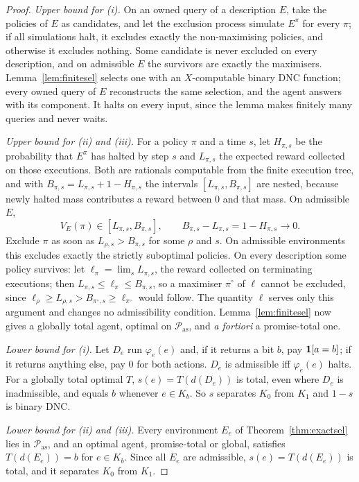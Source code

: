 \begin{proof}
\emph{Upper bound for (i).} On an owned query of a description $E$, take the policies of $E$ as
candidates, and let the exclusion process simulate $E^\pi$ for every $\pi$; if all simulations halt,
it excludes exactly the non-maximising policies, and otherwise it excludes nothing. Some candidate is
never excluded on every description, and on admissible $E$ the survivors are exactly the maximisers.
Lemma~\ref{lem:finitesel} selects one with an $X$-computable binary DNC function; every owned query of
$E$ reconstructs the same selection, and the agent answers with its component. It halts on every
input, since the lemma makes finitely many queries and never waits.

\emph{Upper bound for (ii) and (iii).} For a policy $\pi$ and a time $s$, let $H_{\pi,s}$ be the
probability that $E^\pi$ has halted by step $s$ and $L_{\pi,s}$ the expected reward collected on those
executions. Both are rationals computable from the finite execution tree, and with
$B_{\pi,s}=L_{\pi,s}+1-H_{\pi,s}$ the intervals $[L_{\pi,s},B_{\pi,s}]$ are nested, because newly
halted mass contributes a reward between $0$ and that mass. On admissible $E$,
\begin{equation}\label{eq:intervals}
  V_E(\pi)\in[L_{\pi,s},B_{\pi,s}],\qquad B_{\pi,s}-L_{\pi,s}=1-H_{\pi,s}\to0 .
\end{equation}
Exclude $\pi$ as soon as $L_{\rho,s}>B_{\pi,s}$ for some $\rho$ and $s$. On admissible environments
this excludes exactly the strictly suboptimal policies. On every description some policy survives:
let $\ell_\pi=\lim_sL_{\pi,s}$, the reward collected on terminating executions; then
$L_{\pi,s}\le\ell_\pi\le B_{\pi,s}$, so a maximiser $\pi^\circ$ of $\ell$ cannot be excluded, since
$\ell_\rho\ge L_{\rho,s}>B_{\pi^\circ,s}\ge\ell_{\pi^\circ}$ would follow. The quantity $\ell$ serves only
this argument and changes no admissibility condition. Lemma~\ref{lem:finitesel} now gives a globally
total agent, optimal on $\mathcal P_{\mathrm{as}}$, and \emph{a fortiori} a promise-total one.

\emph{Lower bound for (i).} Let $D_e$ run $\varphi_e(e)$ and, if it returns a bit $b$, pay
$\mathbf{1}[a=b]$; if it returns anything else, pay $0$ for both actions. $D_e$ is admissible iff
$\varphi_e(e)$ halts. For a globally total optimal $T$, $s(e)=T(d(D_e))$ is total, even where $D_e$ is
inadmissible, and equals $b$ whenever $e\in K_b$. So $s$ separates $K_0$ from $K_1$ and $1-s$ is binary
DNC.

\emph{Lower bound for (ii) and (iii).} Every environment $E_e$ of Theorem~\ref{thm:exactsel} lies in
$\mathcal P_{\mathrm{as}}$, and an optimal agent, promise-total or global, satisfies $T(d(E_e))=b$ for
$e\in K_b$. Since all $E_e$ are admissible, $s(e)=T(d(E_e))$ is total, and it separates $K_0$ from
$K_1$.
\end{proof}

